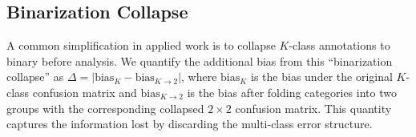 \subsection{Binarization Collapse}
\label{sec:binarization_method}

A common simplification in applied work is to collapse $K$-class annotations to binary before analysis. We quantify the additional bias from this ``binarization collapse'' as $\Delta = |\text{bias}_{K} - \text{bias}_{K \to 2}|$, where $\text{bias}_K$ is the bias under the original $K$-class confusion matrix and $\text{bias}_{K \to 2}$ is the bias after folding categories into two groups with the corresponding collapsed $2{\times}2$ confusion matrix. This quantity captures the information lost by discarding the multi-class error structure.

